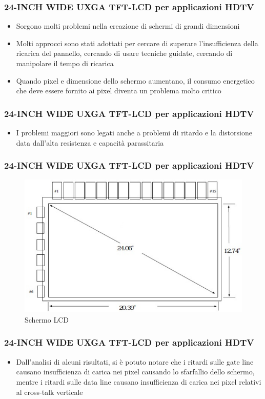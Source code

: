 \documentclass[12pt]{beamer}
\begin{document}
	\begin{frame}
		\frametitle{24-INCH WIDE UXGA TFT-LCD per applicazioni HDTV}
		\begin{itemize}
			\item Sorgono molti problemi nella creazione di schermi di grandi dimensioni
			\pause
			\item Molti approcci sono stati adottati per cercare di superare l’insufficienza della ricarica del pannello,
			cercando di usare tecniche guidate, cercando di manipolare il tempo di ricarica
			\pause
			\item Quando pixel e dimensione dello schermo aumentano, il consumo energetico che deve essere fornito ai pixel diventa un problema molto critico
		\end{itemize}
	\end{frame}
	\begin{frame}
		\frametitle{24-INCH WIDE UXGA TFT-LCD per applicazioni HDTV}
		\begin{itemize}
			\item I problemi maggiori sono legati anche a problemi di ritardo e la distorsione data dall'alta resistenza e capacità parassitaria
		\end{itemize}
	\end{frame}
	\begin{frame}
		\frametitle{24-INCH WIDE UXGA TFT-LCD per applicazioni HDTV}
		\begin{figure}
			\centering
			\includegraphics[width=1\linewidth]{IMMAGINI/schermoLCD}
			\caption{Schermo LCD}
			\label{fig:schermolcd}
		\end{figure}
	\end{frame}
	\begin{frame}
		\frametitle{24-INCH WIDE UXGA TFT-LCD per applicazioni HDTV}
		\begin{itemize}
			\item Dall’analisi di alcuni risultati, si è potuto notare che i ritardi sulle gate line  causano insufficienza di carica nei pixel causando lo sfarfallio dello schermo, mentre i ritardi sulle data line causano insufficienza di carica nei pixel relativi al cross-talk verticale
		\end{itemize}
	\end{frame}
\end{document}
